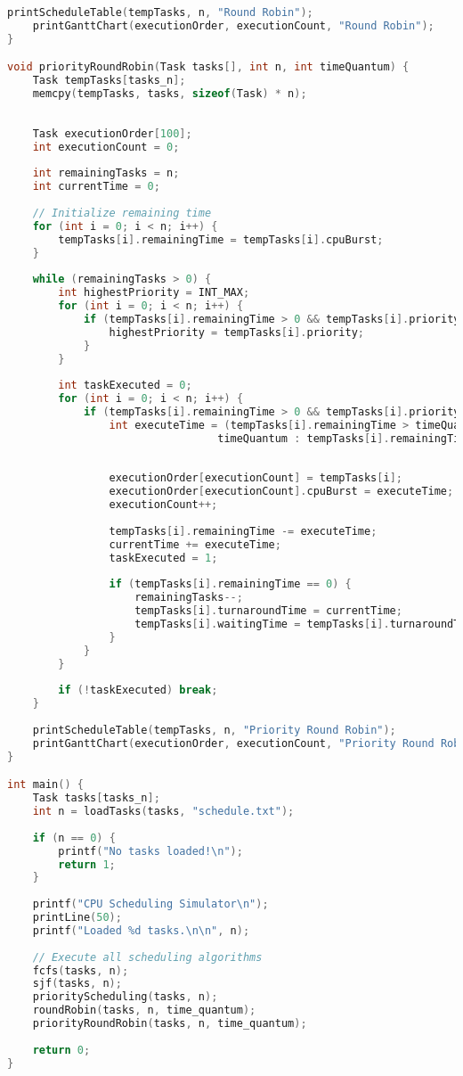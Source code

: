 \documentclass{article}
\begin{document}
\begin{lstlisting}[language=C, caption=Scheduling Code ]
    printScheduleTable(tempTasks, n, "Round Robin");
    printGanttChart(executionOrder, executionCount, "Round Robin");
}

void priorityRoundRobin(Task tasks[], int n, int timeQuantum) {
    Task tempTasks[tasks_n];
    memcpy(tempTasks, tasks, sizeof(Task) * n);
    
  
    Task executionOrder[100];  
    int executionCount = 0;
    
    int remainingTasks = n;
    int currentTime = 0;
    
    // Initialize remaining time
    for (int i = 0; i < n; i++) {
        tempTasks[i].remainingTime = tempTasks[i].cpuBurst;
    }
    
    while (remainingTasks > 0) {
        int highestPriority = INT_MAX;
        for (int i = 0; i < n; i++) {
            if (tempTasks[i].remainingTime > 0 && tempTasks[i].priority < highestPriority) {
                highestPriority = tempTasks[i].priority;
            }
        }
        
        int taskExecuted = 0;
        for (int i = 0; i < n; i++) {
            if (tempTasks[i].remainingTime > 0 && tempTasks[i].priority == highestPriority) {
                int executeTime = (tempTasks[i].remainingTime > timeQuantum) ? 
                                 timeQuantum : tempTasks[i].remainingTime;
                
               
                executionOrder[executionCount] = tempTasks[i];
                executionOrder[executionCount].cpuBurst = executeTime;
                executionCount++;
                
                tempTasks[i].remainingTime -= executeTime;
                currentTime += executeTime;
                taskExecuted = 1;
                
                if (tempTasks[i].remainingTime == 0) {
                    remainingTasks--;
                    tempTasks[i].turnaroundTime = currentTime;
                    tempTasks[i].waitingTime = tempTasks[i].turnaroundTime - tempTasks[i].cpuBurst;
                }
            }
        }
        
        if (!taskExecuted) break;
    }
    
    printScheduleTable(tempTasks, n, "Priority Round Robin");
    printGanttChart(executionOrder, executionCount, "Priority Round Robin");
}

int main() {
    Task tasks[tasks_n];
    int n = loadTasks(tasks, "schedule.txt");
    
    if (n == 0) {
        printf("No tasks loaded!\n");
        return 1;
    }
    
    printf("CPU Scheduling Simulator\n");
    printLine(50);
    printf("Loaded %d tasks.\n\n", n);
    
    // Execute all scheduling algorithms
    fcfs(tasks, n);
    sjf(tasks, n);
    priorityScheduling(tasks, n);
    roundRobin(tasks, n, time_quantum);
    priorityRoundRobin(tasks, n, time_quantum);
    
    return 0;
}
\end{lstlisting}
\end{document}
